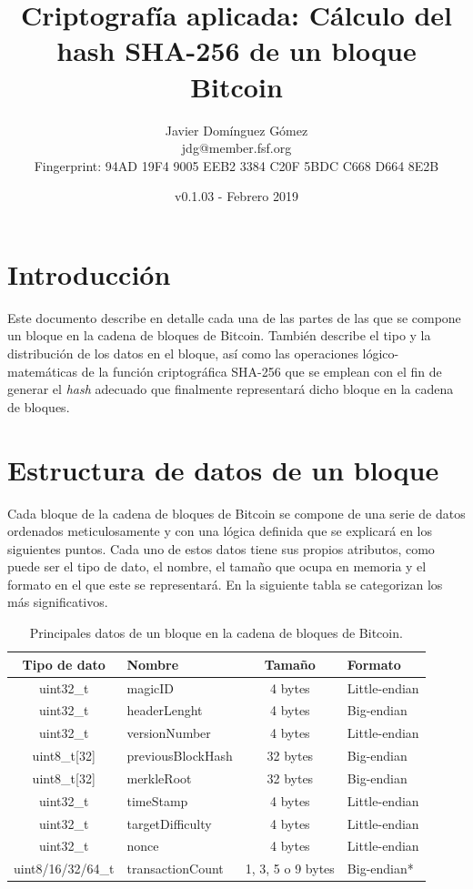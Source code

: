 \documentclass{article}
\title{\textbf{Criptografía aplicada: Cálculo del hash SHA-256 de un bloque Bitcoin}}
\author{Javier Domínguez Gómez \\
\small{jdg@member.fsf.org} \\
\small{Fingerprint: 94AD 19F4 9005 EEB2 3384 C20F 5BDC C668 D664 8E2B}}
\date{v0.1.03 - Febrero 2019}
\begin{document}
\maketitle

\tableofcontents{}

\section{Introducción}
    Este documento describe en detalle cada una de las partes de las que se compone un bloque en la cadena de bloques de Bitcoin. También describe el tipo y la distribución de los datos en el bloque, así como las operaciones lógico-matemáticas de la función criptográfica SHA-256 que se emplean con el fin de generar el \textit{hash} adecuado que finalmente representará dicho bloque en la cadena de bloques.

\section{Estructura de datos de un bloque}
    \vspace{3mm}
    Cada bloque de la cadena de bloques de Bitcoin se compone de una serie de datos ordenados meticulosamente y con una lógica definida que se explicará en los siguientes puntos. Cada uno de estos datos tiene sus propios atributos, como puede ser el tipo de dato, el nombre, el tamaño que ocupa en memoria y el formato en el que este se representará. En la siguiente tabla se categorizan los más significativos.
    \begin{table}[H]
    \centering
    \begin{tabular}{| c | l | c | l |} 
        \hline
        Tipo de dato & Nombre & Tamaño & Formato \\
        \hline
        uint32\_t & magicID & 4 bytes & Little-endian \\
        \hline
        uint32\_t & headerLenght & 4 bytes & Big-endian \\
        \hline
        uint32\_t & versionNumber & 4 bytes & Little-endian \\
        \hline
        uint8\_t[32] & previousBlockHash & 32 bytes & Big-endian \\
        \hline
        uint8\_t[32] & merkleRoot & 32 bytes & Big-endian \\
        \hline
        uint32\_t & timeStamp & 4 bytes & Little-endian \\
        \hline
        uint32\_t & targetDifficulty & 4 bytes & Little-endian \\
        \hline
        uint32\_t & nonce & 4 bytes & Little-endian \\
        \hline
        uint8/16/32/64\_t & transactionCount & 1, 3, 5 o 9 bytes & Big-endian*  \\
        \hline
    \end{tabular}
    \caption{Principales datos de un bloque en la cadena de bloques de Bitcoin.}
    \label{table:0}
    \end{table}
    
\end{document}
